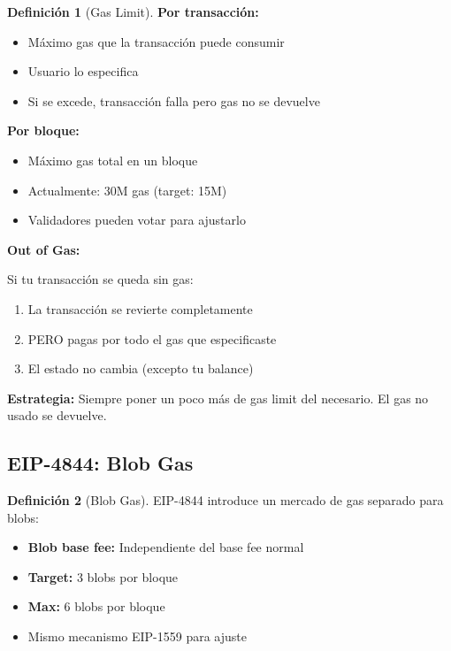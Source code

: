 \documentclass[11pt,a4paper,twoside,openright]{book}
\theoremstyle{definition}
\newtheorem{definition}{Definición}[chapter]
\theoremstyle{plain}
\theoremstyle{remark}
\begin{document}
\begin{definition}[Gas Limit]
\textbf{Por transacción:}
\begin{itemize}
    \item Máximo gas que la transacción puede consumir
    \item Usuario lo especifica
    \item Si se excede, transacción falla pero gas no se devuelve
\end{itemize}

\textbf{Por bloque:}
\begin{itemize}
    \item Máximo gas total en un bloque
    \item Actualmente: 30M gas (target: 15M)
    \item Validadores pueden votar para ajustarlo
\end{itemize}
\end{definition}

\begin{advertencia}
\textbf{Out of Gas:}

Si tu transacción se queda sin gas:
\begin{enumerate}
    \item La transacción se revierte completamente
    \item PERO pagas por todo el gas que especificaste
    \item El estado no cambia (excepto tu balance)
\end{enumerate}

\textbf{Estrategia:} Siempre poner un poco más de gas limit del necesario. El gas no usado se devuelve.
\end{advertencia}

\subsection{EIP-4844: Blob Gas}

\begin{definition}[Blob Gas]
EIP-4844 introduce un mercado de gas separado para blobs:
\begin{itemize}
    \item \textbf{Blob base fee:} Independiente del base fee normal
    \item \textbf{Target:} 3 blobs por bloque
    \item \textbf{Max:} 6 blobs por bloque
    \item Mismo mecanismo EIP-1559 para ajuste
\end{itemize}
\end{definition}
\end{document}

